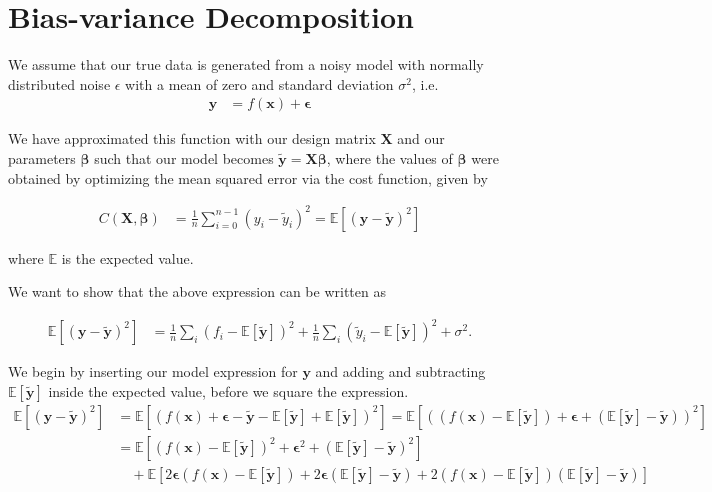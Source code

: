 \documentclass[reprint,english,notitlepage,aps,nobalancelastpage,nofootinbib]{revtex4-1}  %
\newcommand{\expy}{\mathbb{E}[\mathbf{\tilde{y}}]}
\newcommand{\closed}[1]{\left({#1}\right)}
\newcommand{\bracket}[1]{\left[{#1}\right]}
\begin{document}
\clearpage
\appendix

\section{Bias-variance Decomposition}\label{Apx:BVT}

We assume that our true data is generated from a noisy model with normally distributed noise $\epsilon$ with a mean of zero and standard deviation $\sigma^2$, i.e.
\begin{align*}
  \mathbf{y} &= f(\mathbf{x}) + \bm{\epsilon}
\end{align*}

We have approximated this function with our design matrix $\mathbf{X}$ and our parameters $\bm{\beta}$ such that our model becomes $\mathbf{\tilde{y}}=\mathbf{X}\bm{\beta}$, where the values of $\bm{\beta}$ were obtained by optimizing the mean squared error via the cost function, given by

\begin{align*}
  C(\mathbf{X}, \bm{\beta}) &= \frac{1}{n} \sum_{i=0}^{n-1} (y_i - \tilde{y}_i)^2 = \mathbb{E}\left[(\mathbf{y} - \mathbf{\tilde{y}})^2\right]
\end{align*}


where $\mathbb{E}$ is the expected value. %

We want to show that the above expression can be written as

\begin{align*}
  \mathbb{E}\left[(\mathbf{y} - \mathbf{\tilde{y}})^2\right] &= \frac{1}{n} \sum_i (f_i - \expy)^2 + \frac{1}{n}\sum_i (\tilde{y}_i - \expy )^2 + \sigma^2.
\end{align*}

We begin by inserting our model expression for $\mathbf{y}$ and adding and subtracting $\expy$ inside the expected value, before we square the expression.
\begin{align*}
  \mathbb{E}\bracket{(\mathbf{y} - \mathbf{\tilde{y}})^2} &= \mathbb{E}\bracket{(f(\mathbf{x}) + \bm{\epsilon} - \mathbf{\tilde{y}} - \expy + \expy)^2} = \mathbb{E}\bracket{\closed{(f(\mathbf{x}) - \expy) + \bm{\epsilon} + (\expy - \mathbf{\tilde{y}}) }^2 } \\
  &= \mathbb{E}\bracket{(f(\mathbf{x}) - \expy)^2 + \bm{\epsilon}^2 + (\expy - \mathbf{\tilde{y}})^2} \\
  &\quad+ \mathbb{E}\bracket{2\bm{\epsilon} (f(\mathbf{x}) - \expy) + 2\bm{\epsilon}(\expy - \mathbf{\tilde{y}}) + 2 (f(\mathbf{x}) - \expy)(\expy - \mathbf{\tilde{y}})}
\end{align*}
\end{document}
